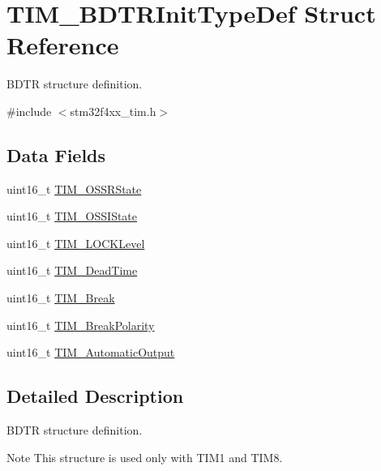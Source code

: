\hypertarget{struct_t_i_m___b_d_t_r_init_type_def}{}\section{T\+I\+M\+\_\+\+B\+D\+T\+R\+Init\+Type\+Def Struct Reference}
\label{struct_t_i_m___b_d_t_r_init_type_def}


B\+D\+TR structure definition.  




{\ttfamily \#include $<$stm32f4xx\+\_\+tim.\+h$>$}

\subsection*{Data Fields}
\begin{DoxyCompactItemize}
\item 
uint16\+\_\+t \hyperlink{struct_t_i_m___b_d_t_r_init_type_def_a5d0ca05d766b82cde0a56a6b61c02f8b}{T\+I\+M\+\_\+\+O\+S\+S\+R\+State}
\item 
uint16\+\_\+t \hyperlink{struct_t_i_m___b_d_t_r_init_type_def_afc160a2e65a93ea65c81bf05aa6f085d}{T\+I\+M\+\_\+\+O\+S\+S\+I\+State}
\item 
uint16\+\_\+t \hyperlink{struct_t_i_m___b_d_t_r_init_type_def_acba399df603976d328261af5cd9ae011}{T\+I\+M\+\_\+\+L\+O\+C\+K\+Level}
\item 
uint16\+\_\+t \hyperlink{struct_t_i_m___b_d_t_r_init_type_def_a136119743510d706b94e605f86b31f82}{T\+I\+M\+\_\+\+Dead\+Time}
\item 
uint16\+\_\+t \hyperlink{struct_t_i_m___b_d_t_r_init_type_def_a7f141e06bab7928bc0b8327f0d20e664}{T\+I\+M\+\_\+\+Break}
\item 
uint16\+\_\+t \hyperlink{struct_t_i_m___b_d_t_r_init_type_def_a71f25c4b4d7207152436dd716a6cb2f1}{T\+I\+M\+\_\+\+Break\+Polarity}
\item 
uint16\+\_\+t \hyperlink{struct_t_i_m___b_d_t_r_init_type_def_a85ef0b5598749ffd67dd360e615bcf9a}{T\+I\+M\+\_\+\+Automatic\+Output}
\end{DoxyCompactItemize}


\subsection{Detailed Description}
B\+D\+TR structure definition. 

\begin{DoxyNote}{Note}
This structure is used only with T\+I\+M1 and T\+I\+M8. 
\end{DoxyNote}


